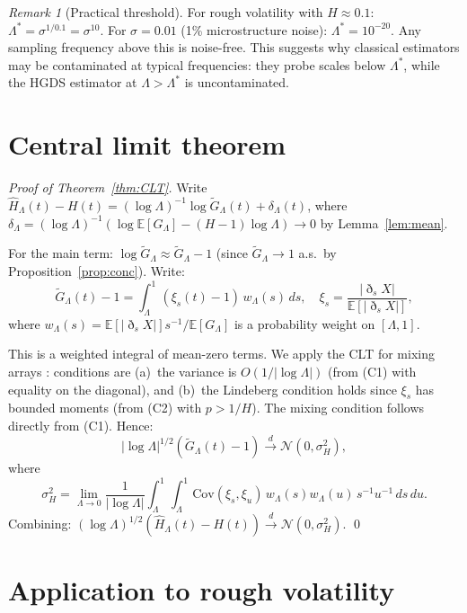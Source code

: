 \documentclass[11pt,a4paper]{article}
\theoremstyle{definition}
\theoremstyle{remark}
\newtheorem{remark}[theorem]{Remark}
\newcommand{\E}{\mathbb{E}}
\newcommand{\GL}{G_\Lambda}
\newcommand{\Hhat}{\hat{H}_\Lambda}
\begin{document}
\begin{remark}[Practical threshold]\label{rem:threshold}
For rough volatility with $H\approx0.1$:
$\Lambda^*=\sigma^{1/0.1}=\sigma^{10}$.
For $\sigma=0.01$ (1\% microstructure noise): $\Lambda^*=10^{-20}$.
Any sampling frequency above this is noise-free. This suggests why
classical estimators may be contaminated at typical frequencies: they
probe scales below $\Lambda^*$, while the HGDS estimator at
$\Lambda>\Lambda^*$ is uncontaminated.
\end{remark}

\section{Central limit theorem}

\begin{proof}[Proof of Theorem~\ref{thm:CLT}]
Write $\Hhat(t)-H(t)=(\log\Lambda)^{-1}\log\tilde G_\Lambda(t)+\delta_\Lambda(t)$,
where $\delta_\Lambda=(\log\Lambda)^{-1}(\log\E[\GL]-(H-1)\log\Lambda)\to0$
by Lemma~\ref{lem:mean}.

For the main term: $\log\tilde G_\Lambda\approx\tilde G_\Lambda-1$
(since $\tilde G_\Lambda\to1$ a.s.\ by Proposition~\ref{prop:conc}).
Write:
\[
  \tilde G_\Lambda(t)-1
  = \int_\Lambda^1(\xi_s(t)-1)\,w_\Lambda(s)\,ds,\quad
  \xi_s=\frac{|\eth_s X|}{\E[|\eth_s X|]},
\]
where $w_\Lambda(s)=\E[|\eth_s X|]s^{-1}/\E[\GL]$ is a probability
weight on $[\Lambda,1]$.

This is a weighted integral of mean-zero terms. We apply the CLT
for mixing arrays \cite{ibragimov1975}: conditions are (a)~the
variance is $O(1/|\log\Lambda|)$ (from (C1) with equality on the
diagonal), and (b)~the Lindeberg condition holds since $\xi_s$ has
bounded moments (from (C2) with $p>1/H$). The mixing condition
follows directly from (C1). Hence:
\[
  |\log\Lambda|^{1/2}(\tilde G_\Lambda(t)-1)
  \xrightarrow{d}\mathcal{N}(0,\sigma_H^2),
\]
where
\[
  \sigma_H^2 = \lim_{\Lambda\to0}\frac{1}{|\log\Lambda|}
  \int_\Lambda^1\!\int_\Lambda^1
  \mathrm{Cov}(\xi_s,\xi_u)\,w_\Lambda(s)w_\Lambda(u)\,
  s^{-1}u^{-1}\,ds\,du.
\]
Combining: $(\log\Lambda)^{1/2}(\Hhat(t)-H(t))\xrightarrow{d}
\mathcal{N}(0,\sigma_H^2)$. \qed
\end{proof}

\section{Application to rough volatility}
\end{document}
